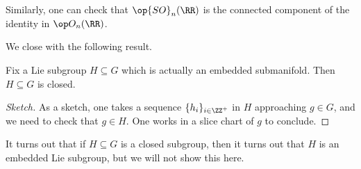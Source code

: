 \documentclass[../notes.tex]{subfiles}
\begin{document}
\begin{example}
	Similarly, one can check that $\op{SO}_n(\RR)$ is the connected component of the identity in $\op O_n(\RR)$.
\end{example}
We close with the following result.
\begin{proposition}
	Fix a Lie subgroup $H\subseteq G$ which is actually an embedded submanifold. Then $H\subseteq G$ is closed.
\end{proposition}
\begin{proof}[Sketch]
	As a sketch, one takes a sequence $\{h_i\}_{i\in\ZZ^+}$ in $H$ approaching $g\in G$, and we need to check that $g\in H$. One works in a slice chart of $g$ to conclude.
\end{proof}
\begin{remark}
	It turns out that if $H\subseteq G$ is a closed subgroup, then it turns out that $H$ is an embedded Lie subgroup, but we will not show this here.
\end{remark}
\end{document}
